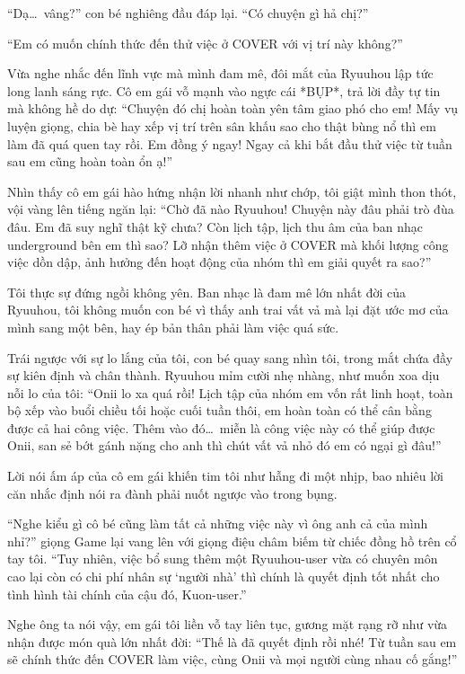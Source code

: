 \documentclass[../main.tex]{subfiles}
\begin{document}
``Dạ\dots\ vâng?'' con bé nghiêng đầu đáp lại. ``Có chuyện gì hả chị?''

``Em có muốn chính thức đến thử việc ở COVER với vị trí này không?''

Vừa nghe nhắc đến lĩnh vực mà mình đam mê, đôi mắt của Ryuuhou lập tức long lanh sáng rực. Cô em gái vỗ mạnh vào ngực cái *BỤP*, trả lời đầy tự tin mà không hề do dự: ``Chuyện đó chị hoàn toàn yên tâm giao phó cho em! Mấy vụ luyện giọng, chia bè hay xếp vị trí trên sân khấu sao cho thật bùng nổ thì em làm đã quá quen tay rồi. Em đồng ý ngay! Ngay cả khi bắt đầu thử việc từ tuần sau em cũng hoàn toàn ổn ạ!''

Nhìn thấy cô em gái hào hứng nhận lời nhanh như chớp, tôi giật mình thon thót, vội vàng lên tiếng ngăn lại: ``Chờ đã nào Ryuuhou! Chuyện này đâu phải trò đùa đâu. Em đã suy nghĩ thật kỹ chưa? Còn lịch tập, lịch thu âm của ban nhạc underground bên em thì sao? Lỡ nhận thêm việc ở COVER mà khối lượng công việc dồn dập, ảnh hưởng đến hoạt động của nhóm thì em giải quyết ra sao?''

Tôi thực sự đứng ngồi không yên. Ban nhạc là đam mê lớn nhất đời của Ryuuhou, tôi không muốn con bé vì thấy anh trai vất vả mà lại đặt ước mơ của mình sang một bên, hay ép bản thân phải làm việc quá sức.

Trái ngược với sự lo lắng của tôi, con bé quay sang nhìn tôi, trong mắt chứa đầy sự kiên định và chân thành. Ryuuhou mỉm cười nhẹ nhàng, như muốn xoa dịu nỗi lo của tôi: ``Onii lo xa quá rồi! Lịch tập của nhóm em vốn rất linh hoạt, toàn bộ xếp vào buổi chiều tối hoặc cuối tuần thôi, em hoàn toàn có thể cân bằng được cả hai công việc. Thêm vào đó\dots\ miễn là công việc này có thể giúp được Onii, san sẻ bớt gánh nặng cho anh thì chút vất vả nhỏ đó em có ngại gì đâu!''

Lời nói ấm áp của cô em gái khiến tim tôi như hẫng đi một nhịp, bao nhiêu lời căn nhắc định nói ra đành phải nuốt ngược vào trong bụng.

``Nghe kiểu gì cô bé cũng làm tất cả những việc này vì ông anh cả của mình nhỉ?'' giọng Game lại vang lên với giọng điệu châm biếm từ chiếc đồng hồ trên cổ tay tôi. ``Tuy nhiên, việc bổ sung thêm một Ryuuhou-user vừa có chuyên môn cao lại còn có chi phí nhân sự `người nhà' thì chính là quyết định tốt nhất cho tình hình tài chính của cậu đó, Kuon-user.''

Nghe ông ta nói vậy, em gái tôi liền vỗ tay liên tục, gương mặt rạng rỡ như vừa nhận được món quà lớn nhất đời: ``Thế là đã quyết định rồi nhé! Từ tuần sau em sẽ chính thức đến COVER làm việc, cùng Onii và mọi người cùng nhau cố gắng!''
\end{document}
